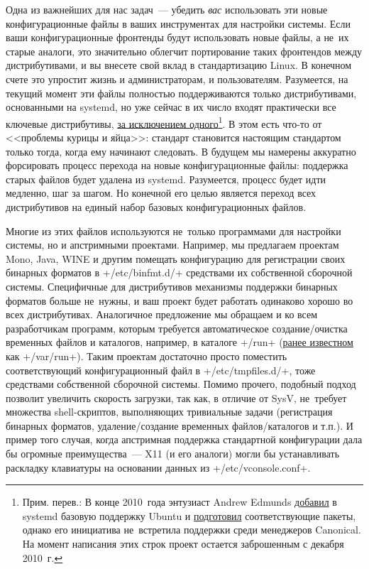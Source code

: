 \documentclass[10pt,oneside,a4paper]{article}
\begin{document}
Одна из важнейших для нас задач~--- убедить \emph{вас} использовать эти новые
конфигурационные файлы в ваших инструментах для настройки системы. Если ваши
конфигурационные фронтенды будут использовать новые файлы, а не~их старые
аналоги, это значительно облегчит портирование таких фронтендов между
дистрибутивами, и вы внесете свой вклад в стандартизацию Linux. В конечном счете
это упростит жизнь и администраторам, и пользователям. Разумеется, на текущий
момент эти файлы полностью поддерживаются только дистрибутивами, основанными на
systemd, но уже сейчас в их число входят практически все ключевые дистрибутивы,
\href{http://www.ubuntu.com/}{за исключением
одного}\footnote{Прим. перев.: В конце 2010~года энтузиаст Andrew Edmunds
\href{http://cgit.freedesktop.org/systemd/systemd/commit/?id=858dae181bb5461201ac1c04732d3ef4c67a0256}{добавил}
в systemd базовую поддержку Ubuntu и
\href{https://wiki.ubuntu.com/systemd}{подготовил} соответствующие пакеты,
однако его инициатива не~встретила поддержки среди менеджеров Canonical. На
момент написания этих строк проект остается заброшенным с декабря 2010~г.}.  В
этом есть что-то от <<проблемы курицы и яйца>>: стандарт становится настоящим
стандартом только тогда, когда ему начинают следовать. В будущем мы намерены
аккуратно форсировать процесс перехода на новые конфигурационные файлы:
поддержка старых файлов будет удалена из systemd. Разумеется, процесс будет
идти медленно, шаг за шагом. Но конечной его целью является переход всех
дистрибутивов на единый набор базовых конфигурационных файлов.

Многие из этих файлов используются не~только программами для настройки системы,
но и апстримными проектами. Например, мы предлагаем проектам Mono, Java, WINE и
другим помещать конфигурацию для регистрации своих бинарных форматов в
+/etc/binfmt.d/+ средствами их собственной сборочной системы. Специфичные для
дистрибутивов механизмы поддержки бинарных форматов больше не~нужны, и ваш
проект будет работать одинаково хорошо во всех дистрибутивах. Аналогичное
предложение мы обращаем и ко всем разработчикам программ, которым требуется
автоматическое создание/очистка временных файлов и каталогов,
например, в каталоге +/run+ (\href{http://lwn.net/Articles/436012/}{ранее
известном} как +/var/run+). Таким проектам достаточно просто поместить
соответствующий конфигурационный файл в +/etc/tmpfiles.d/+, тоже средствами
собственной сборочной системы. Помимо прочего, подобный подход позволит
увеличить скорость загрузки, так как, в отличие от SysV, не~требует множества
shell-скриптов, выполняющих тривиальные задачи (регистрация бинарных форматов,
удаление/создание временных файлов/каталогов и т.п.). И пример того случая,
когда апстримная поддержка стандартной конфигурации дала бы огромные
преимущества~--- X11 (и его аналоги) могли бы устанавливать раскладку клавиатуры
на основании данных из +/etc/vconsole.conf+.
\end{document}
